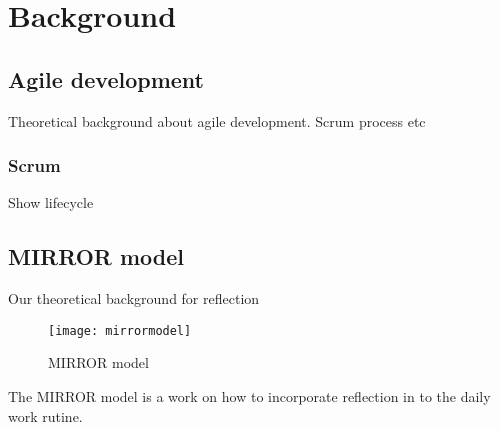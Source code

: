 \chapter{Background}

\section{Agile development}
Theoretical background about agile development. Scrum process etc

\subsection{Scrum}
Show lifecycle

\section{MIRROR model}

Our theoretical background for reflection
\begin{figure}[h!]
\label{logo}
\centering
	\texttt{[image: mirrormodel]}
\caption{MIRROR model}
\end{figure}
The MIRROR model is a work on how to incorporate reflection in to the daily work rutine.

